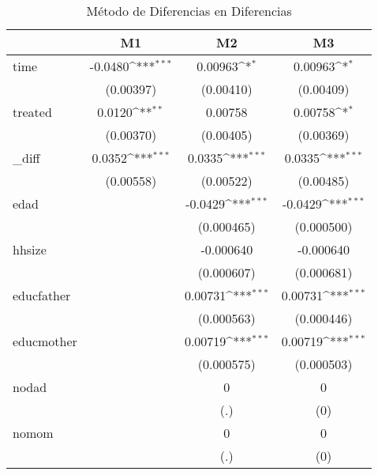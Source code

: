 \begin{table}[htbp]\centering
\def\sym#1{\ifmmode^{#1}\else\(^{#1}\)\fi}
\caption{Método de Diferencias en Diferencias\label{Cuadro1}}
\begin{tabular}{l*{3}{c}}
\hline\hline
            &\multicolumn{1}{c}{M1}&\multicolumn{1}{c}{M2}&\multicolumn{1}{c}{M3}\\
\hline
time        &     -0.0480\sym{***}&     0.00963\sym{*}  &     0.00963\sym{*}  \\
            &   (0.00397)         &   (0.00410)         &   (0.00409)         \\
[1em]
treated     &      0.0120\sym{**} &     0.00758         &     0.00758\sym{*}  \\
            &   (0.00370)         &   (0.00405)         &   (0.00369)         \\
[1em]
\_diff       &      0.0352\sym{***}&      0.0335\sym{***}&      0.0335\sym{***}\\
            &   (0.00558)         &   (0.00522)         &   (0.00485)         \\
[1em]
edad        &                     &     -0.0429\sym{***}&     -0.0429\sym{***}\\
            &                     &  (0.000465)         &  (0.000500)         \\
[1em]
hhsize      &                     &   -0.000640         &   -0.000640         \\
            &                     &  (0.000607)         &  (0.000681)         \\
[1em]
educfather  &                     &     0.00731\sym{***}&     0.00731\sym{***}\\
            &                     &  (0.000563)         &  (0.000446)         \\
[1em]
educmother  &                     &     0.00719\sym{***}&     0.00719\sym{***}\\
            &                     &  (0.000575)         &  (0.000503)         \\
[1em]
nodad       &                     &           0         &           0         \\
            &                     &         (.)         &         (0)         \\
[1em]
nomom       &                     &           0         &           0         \\
            &                     &         (.)         &         (0)         \\

\end{tabular}
\end{table}
